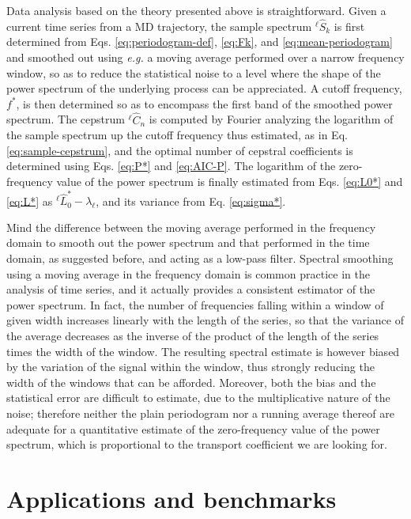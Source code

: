 Data analysis based on the theory presented above is straightforward. Given a current time series from a MD trajectory, the sample spectrum $^\ell\hat S_k$ is first determined from Eqs. \eqref{eq:periodogram-def}, \eqref{eq:Fk}, and \eqref{eq:mean-periodogram} 
and smoothed out using \emph{e.g.} a moving average \cite{MovingAverage} performed over a narrow frequency window, so as to reduce the statistical noise to a level where the shape of the power spectrum of the underlying process can be appreciated.
A cutoff frequency, $f^*$, is then determined so as to encompass the first band of the smoothed power spectrum. The cepstrum $^\ell\hat C_n$ is computed by Fourier analyzing the logarithm of the sample spectrum up the cutoff frequency thus estimated, as in Eq. \eqref{eq:sample-cepstrum}, and the optimal number of cepstral coefficients is determined using Eqs. \eqref{eq:P*} and \eqref{eq:AIC-P}. The logarithm of the zero-frequency value of the power spectrum is finally estimated from Eqs. \eqref{eq:L0*} and \eqref{eq:L*} as  $^\ell{\hat L}^*_0-\lambda_\ell$, and its variance from Eq. \eqref{eq:sigma*}.

Mind the difference between the moving average performed in the frequency domain to smooth out the power spectrum and that performed in the time domain, as suggested before, and acting as a low-pass filter. Spectral smoothing using a moving average in the frequency domain is common practice in the analysis of time series, and it actually provides a consistent estimator of the power spectrum. In fact, the number of frequencies falling within a window of given width increases linearly with the length of the series, so that the variance of the average decreases as the inverse of the product of the length of the series times the width of the window. The resulting spectral estimate is however biased by the variation of the signal within the window, thus strongly reducing the width of the windows that can be afforded. Moreover, both the bias and the statistical error are difficult to estimate, due to the multiplicative nature of the noise; therefore neither the plain periodogram nor a running average thereof are adequate for a quantitative estimate of the zero-frequency value of the power spectrum, which is proportional to the transport coefficient we are looking for.

\section{Applications and benchmarks}
\label{sec:applications}

